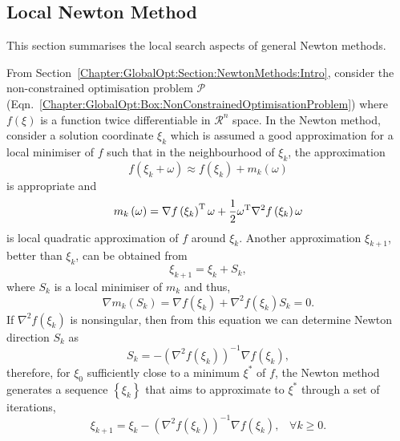 \subsection{Local Newton Method}\label{Chapter:GlobalOpt:Section:NewtonMethods:LocalNewton}
This section summarises the local search aspects of general Newton methods.

From Section~\ref{Chapter:GlobalOpt:Section:NewtonMethods:Intro}, consider the non-constrained optimisation problem $\mathcal{P}$ (Eqn.~\ref{Chapter:GlobalOpt:Box:NonConstrainedOptimisationProblem}) where $f\left(\xi\right)$ is a function twice differentiable in $\mathcal{R}^{n}$ space. In the Newton method, consider a solution coordinate $\xi_{k}$ which is assumed a good approximation for a local minimiser of $f$ such that in the neighbourhood of $\xi_{k}$, the approximation
\begin{equation}
    f\left(\xi_{k}+\omega\right) \approx f\left(\xi_{k}\right) + m_{k}\left(\omega\right)
\end{equation}
is appropriate and 
\begin{equation}
m_{k}\left(\omega\right) = \nabla f\left(\xi_{k}\right)^{\text{T}}\omega + \displaystyle\frac{1}{2}\omega^{\text{T}}\nabla^{2}f\left(\xi_{k}\right)\omega
\end{equation}
is local quadratic approximation of $f$ around $\xi_{k}$. Another approximation $\xi_{k+1}$, better than $\xi_{k}$, can be obtained from
\begin{displaymath}
   \xi_{k+1} = \xi_{k} + S_{k},
\end{displaymath}
where $S_{k}$ is a local minimiser of $m_{k}$ and thus,
\begin{equation}
   \nabla m_{k}\left(S_{k}\right) = \nabla f\left(\xi_{k}\right) + \nabla^{2} f\left(\xi_{k}\right)S_{k} = 0.
\end{equation}
If $ \nabla^{2} f\left(\xi_{k}\right)$ is nonsingular, then from this equation we can determine Newton direction $S_{k}$ as
\begin{equation}
   S_{k} = - \left(\nabla^{2} f\left(\xi_{k}\right)\right)^{-1}\nabla f\left(\xi_{k}\right),
\end{equation}
therefore, for $\xi_{0}$ sufficiently close to a minimum $\xi^{\ast}$ of $f$, the Newton method generates a sequence $\left\{\xi_{k}\right\}$ that aims to approximate to $\xi^{\ast}$ through a set of iterations,
\begin{equation}
   \xi_{k+1} = \xi_{k} - \left(\nabla^{2} f\left(\xi_{k}\right)\right)^{-1}\nabla f\left(\xi_{k}\right),\;\;\;\forall k\ge 0.\label{Chapter:GlobalOpt:Eqn:NewtonMethod_1}
\end{equation}
